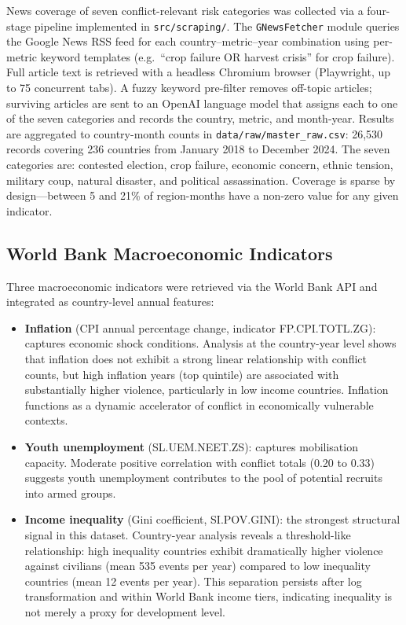 \documentclass[12pt,a4paper]{article}
\begin{document}
News coverage of seven conflict-relevant risk categories was collected
via a four-stage pipeline implemented in \texttt{src/scraping/}.
The \texttt{GNewsFetcher} module queries the Google News RSS feed for
each country--metric--year combination using per-metric keyword
templates (e.g.\ ``crop failure OR harvest crisis'' for crop failure).
Full article text is retrieved with a headless Chromium browser
(Playwright, up to 75 concurrent tabs). A fuzzy keyword pre-filter
removes off-topic articles; surviving articles are sent to an OpenAI
language model that assigns each to one of the seven categories and
records the country, metric, and month-year. Results are aggregated to
country-month counts in \texttt{data/raw/master\_raw.csv}: 26,530
records covering 236 countries from January 2018 to December 2024.
The seven categories are: contested election, crop failure, economic
concern, ethnic tension, military coup, natural disaster, and political
assassination. Coverage is sparse by design---between 5 and 21\% of
region-months have a non-zero value for any given indicator.

\subsection{World Bank Macroeconomic Indicators}

Three macroeconomic indicators were retrieved via the World Bank API
and integrated as country-level annual features:

\begin{itemize}
    \item \textbf{Inflation} (CPI annual percentage change,
          indicator FP.CPI.TOTL.ZG): captures economic shock conditions.
          Analysis at the country-year level shows that inflation does not
          exhibit a strong linear relationship with conflict counts, but
          high inflation years (top quintile) are associated with
          substantially higher violence, particularly in low income
          countries. Inflation functions as a dynamic accelerator of
          conflict in economically vulnerable contexts.
    \item \textbf{Youth unemployment} (SL.UEM.NEET.ZS): captures
          mobilisation capacity. Moderate positive correlation with
          conflict totals (0.20 to 0.33) suggests youth unemployment
          contributes to the pool of potential recruits into armed groups.
    \item \textbf{Income inequality} (Gini coefficient,
          SI.POV.GINI): the strongest structural signal in this dataset.
          Country-year analysis reveals a threshold-like relationship:
          high inequality countries exhibit dramatically higher violence
          against civilians (mean 535 events per year) compared to low
          inequality countries (mean 12 events per year). This separation
          persists after log transformation and within World Bank income
          tiers, indicating inequality is not merely a proxy for
          development level.
\end{itemize}
\end{document}
